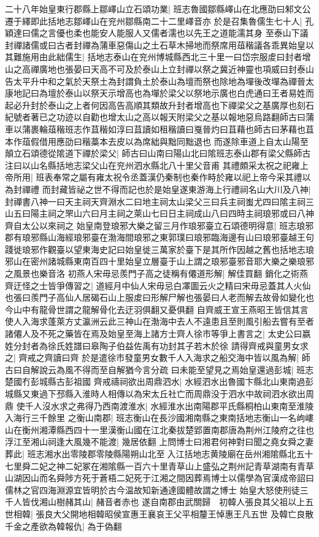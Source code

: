二十八年始皇東行郡縣上鄒嶧山立石頌功業|{
	班志魯國鄒縣嶧山在北應劭曰邾文公遷于繹即此括地志鄒嶧山在兖州鄒縣南二十二里嶧音亦}
於是召集魯儒生七十人|{
	孔穎達曰儒之言優也柔也能安人能服人又儒者濡也以先王之道能濡其身}
至泰山下議封禪諸儒或曰古者封禪為蒲車惡傷山之土石草木掃地而祭席用葅稭議各乖異始皇以其難施用由此絀儒生|{
	括地志泰山在兖州博城縣西北三十里一曰岱宗服䖍曰封者增山之高禪廣地也張晏曰天高不可及於泰山上立封禪以祭之冀近神靈也項威曰封泰山告太平升中和之氣於天祭土為封謂負土於泰山為壇而祭也除地為墠後改墠為禪晉太康地記曰為壇於泰山以祭天示增高也為墠於梁父以祭地示廣也白虎通曰王者易姓而起必升封於泰山之上者何因高告高順其類故升封者增高也下禪梁父之基廣厚也刻石紀號者著已之功迹以自勸也增太山之高以報天附梁父之基以報地惡烏路翻師古曰蒲車以蒲裹輪葅稭班志作苴稭如淳曰苴讀如租稭讀曰戛晉灼曰苴藉也師古曰茅藉也苴本作葅假借用應劭曰稭藁本去皮以為席絀與黜同黜退也}
而遂除車道上自太山陽至顛立石頌德從隂道下禪於梁父|{
	師古曰山南曰陽山北曰隂班志泰山郡有梁父縣師古注曰以山名縣括地志梁父山在兖州泗水縣北八十里父音甫}
其禮頗采太祝之祀雍上帝所用|{
	班表奉常之屬有雍太祝令丞蓋漢仍秦制也秦作畤於雍以祀上帝今采其禮以為封禪禮}
而封藏皆祕之世不得而記也於是始皇遂東游海上行禮祠名山大川及八神|{
	封禪書八神一曰天主祠天齊淵水二曰地主祠太山梁父三曰兵主祠蚩尤四曰隂主祠三山五曰陽主祠之罘山六曰月主祠之萊山七曰日主祠成山八曰四時主祠琅邪或曰八神齊自太公以來祠之}
始皇南登琅邪大樂之留三月作琅邪臺立石頌德明得意|{
	班志琅邪郡有琅邪縣山海經琅邪臺在渤海間琅邪之東郭璞曰琅邪臨海邊有山曰琅邪臺越王句踐徙琅邪作觀臺以望東海史記曰始皇徙三萬家於臺下是其所作因越之舊也括地志琅邪山在密州諸城縣東南百四十里始皇立層臺于山上謂之琅邪臺邪音耶大樂之樂琅邪之風景也樂音洛}
初燕人宋毋忌羨門子高之徒稱有僊道形解|{
	解佳買翻}
銷化之術燕齊迂怪之士皆爭傳習之|{
	道經月中仙人宋毋忌白凙圖云火之精曰宋毋忌蓋其人火仙也張曰羨門子高仙人居碣石山上服䖍曰形解尸解也張晏曰人老而解去故骨如變化也今山中有龍骨世謂之龍解骨化去迂羽俱翻又憂俱翻}
自齊威王宣王燕昭王皆信其言使人入海求蓬萊方丈瀛洲云此三神山在渤海中去人不遠患且至則風引船去嘗有至者諸僊人及不死之藥皆在焉及始皇至海上諸方士齊人徐市等爭上書言之|{
	太史公曰嬴姓分封者為徐氏姓譜曰皋陶子伯益佐禹有功封其子若木於徐}
請得齊戒與童男女求之|{
	齊戒之齊讀曰齊}
於是遣徐市發童男女數千人入海求之船交海中皆以風為解|{
	師古曰自解說云為風不得而至自解猶今言分疏}
曰未能至望見之焉始皇還過彭城|{
	班志楚國冇彭城縣古彭祖國}
齊戒禱祠欲出周鼎泗水|{
	水經泗水出魯國卞縣北山東南過彭城縣又東過下邳縣入淮時人相傳以為宋太丘社亡而周鼎没于泗水中故祠泗水欲出周鼎}
使千人沒水求之弗得乃西南渡淮水|{
	水經淮水出南陽郡平氏縣桐柏山東南至淮陵入海行三千餘里}
之衡山南郡|{
	班志衡山在長沙國湘南縣之東南括地志衡山一名岣嶁山在衡州湘潭縣西四十一里漢衡山國在江北秦拔楚郢置南郡唐為荆州江陵府之往也}
浮江至湘山祠逢大風幾不能渡|{
	幾居依翻}
上問博士曰湘君何神對曰聞之堯女舜之妻葬此|{
	班志湘水出零陵郡零陵縣陽朔山北至入江括地志黄陵廟在岳州湘隂縣北五十七里舜二妃之神二妃冢在湘隂縣一百六十里青草山上盛弘之荆州記青草湖南有青草山湖因山而名舜陟方死于蒼梧二妃死于江湘之間因葬焉博士以儒學為官漢成帝詔曰儒林之官四海淵源宜皆明於古今温故知新通達國體故謂之博士}
始皇大怒使刑徒三千人皆伐湘山樹赭其山|{
	赭音者赤也}
遂自南郡由武關歸　初韓人張良其父祖以上五世相韓|{
	張良大父開地相韓昭侯宣惠王襄哀王父平相釐王悼惠王凡五世}
及韓亡良散千金之產欲為韓報仇|{
	為于偽翻}


